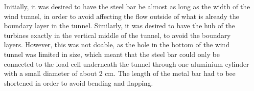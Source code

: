 Initially, it was desired to have the steel bar be almost as long as the width of the wind tunnel, in order to avoid affecting the flow outside of what is already the boundary layer in the tunnel. Similarly, it was desired to have the hub of the turbines exactly in the vertical middle of the tunnel, to avoid the boundary layers. However, this was not doable, as the hole in the bottom of the wind tunnel was limited in size, which meant that the steel bar could only be connected to the load cell underneath the tunnel through one aluminium cylinder with a small diameter of about 2 cm. The length of the metal bar had to bee shortened in order to avoid bending and flapping. 







 